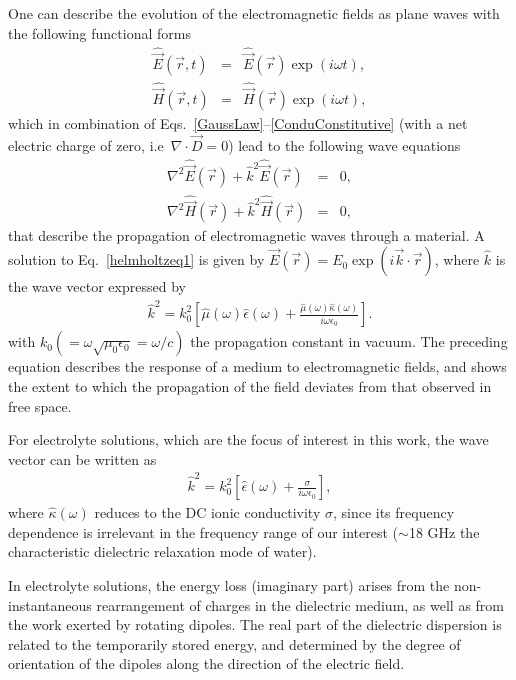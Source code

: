 One can describe the evolution of the electromagnetic fields as plane waves with the following functional forms
\begin{eqnarray}
\hat{\vec{E}} (\vec{r},t) &=& \hat{\vec{E}} (\vec{r}) \exp (i \omega t),\\
\hat{\vec{H}} (\vec{r},t) &=& \hat{\vec{H}} (\vec{r}) \exp (i \omega t),
\label{harmonicoscillators}
\end{eqnarray}
\noindent which in combination of Eqs.\ \ref{GaussLaw}--\ref{ConduConstitutive} (with a net electric charge of zero, i.e\ $\nabla \cdot \vec{D} = 0$) lead to the following wave equations
\begin{eqnarray}
\nabla^2 \hat{\vec{E}} (\vec{r}) + \hat{k}^2 \hat{\vec{E}} (\vec{r}) &=& 0 ,
\label{helmholtzeq1}
\\ \nabla^2 \hat{\vec{H}} (\vec{r}) + \hat{k}^2 \hat{\vec{H}} (\vec{r}) &=& 0,
\label{helmholtzeq2}
\end{eqnarray}
\noindent that describe the propagation of electromagnetic waves through a material. A solution to Eq.\ \ref{helmholtzeq1} is given by $\vec{E} (\vec{r}) = E_0 \exp(i \vec{k} \cdot \vec{r})$, where $\hat{k}$ is the wave vector expressed by 
\begin{eqnarray}
\hat{k}^2 = k_0^2 \left[ \hat{\mu} (\omega) \hat{\epsilon} (\omega) + \frac{\hat{\mu} (\omega)  \hat{\kappa} (\omega)} {i \omega \epsilon_0}   \right].
\label{wavenumberP}
\end{eqnarray}
\noindent with $k_0 (= \omega \sqrt{\mu_0 \epsilon_0} = \omega/c  )$ the propagation constant in vacuum. The preceding equation describes the response of a medium to electromagnetic fields, and shows the extent to which the propagation of the field deviates from that observed in free space.


For electrolyte solutions, which are the focus of interest in this work, the wave vector can be written as
\begin{eqnarray}
\hat{k}^2 = k_0^2 \left[ \hat{\epsilon} (\omega) + \frac{  \sigma} {i \omega \epsilon_0}   \right],
\label{wavenumberP2}
\end{eqnarray}
\noindent where $\hat{\kappa} (\omega)$ reduces to the DC ionic conductivity $\sigma$, since its frequency dependence is irrelevant in the frequency range of our interest ($\sim$18 GHz the characteristic dielectric relaxation mode of water).\!\cite{Ghowsi1989,Anderson1994a,Ellison1996,Buchner1999b}

In electrolyte solutions, the energy loss (imaginary part) arises from the non-instantaneous rearrangement of charges in the dielectric medium, as well as from the work exerted by rotating dipoles. The real part of the dielectric dispersion is related to the temporarily stored energy, and determined by the degree of orientation of the dipoles along the direction of the electric field.


